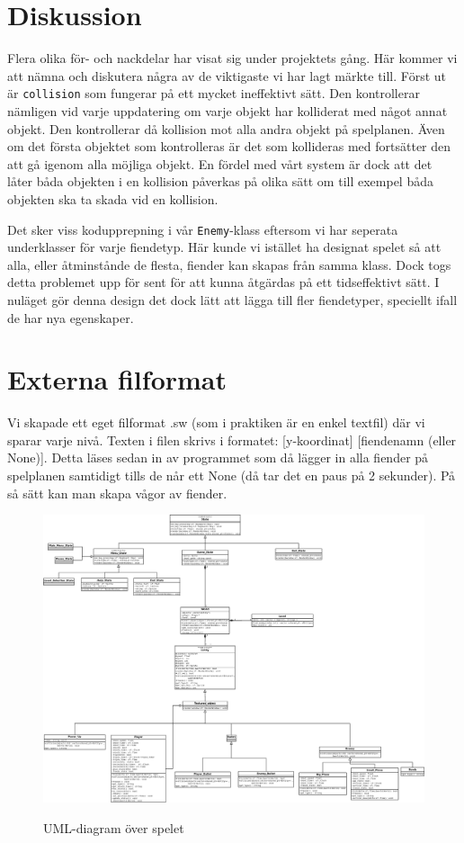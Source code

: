 \documentclass{TDP003mall}
\begin{document}
\section{Diskussion}
Flera olika för- och nackdelar har visat sig under projektets gång. Här kommer vi att nämna och diskutera några av de viktigaste vi har lagt märkte till. 
Först ut är \texttt{collision} som fungerar på ett mycket ineffektivt sätt. Den kontrollerar nämligen vid varje uppdatering om varje objekt har kolliderat med något annat objekt. 
Den kontrollerar då kollision mot alla andra objekt på spelplanen. Även om det första objektet som kontrolleras är det som kollideras med fortsätter den att gå igenom alla möjliga objekt. En fördel med vårt system är dock att det låter båda objekten i en kollision påverkas på olika sätt om till exempel båda objekten ska ta skada vid en kollision.

Det sker viss kodupprepning i vår \texttt{Enemy}-klass eftersom vi har seperata underklasser för varje fiendetyp. Här kunde vi istället ha designat spelet så att alla, eller åtminstånde de flesta, fiender kan skapas från samma klass. Dock togs detta problemet upp för sent för att kunna åtgärdas på ett tidseffektivt sätt. I nuläget gör denna design det dock lätt att lägga till fler fiendetyper, speciellt ifall de har nya egenskaper.

\section{Externa filformat} 
Vi skapade ett eget filformat .sw (som i praktiken är en enkel textfil) där vi sparar varje nivå. Texten i filen skrivs i formatet: [y-koordinat] [fiendenamn (eller None)]. 
Detta läses sedan in av programmet som då lägger in alla fiender på spelplanen samtidigt tills de når ett None (då tar det en paus på 2 sekunder). På så sätt kan man skapa vågor av fiender.
\begin{figure}[h!]
\centering
\includegraphics[scale=0.2]{UML_diagram.png}
\label{}
\caption{UML-diagram över spelet}
\end{figure}
\end{document}
